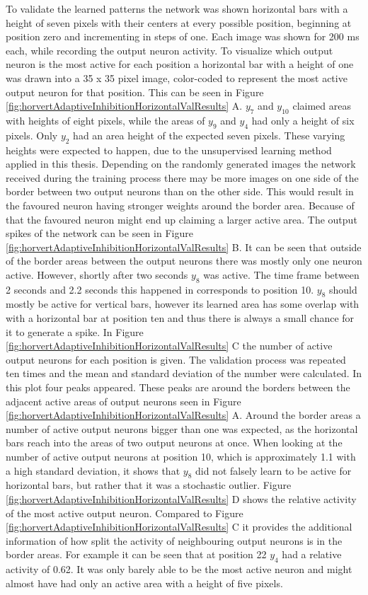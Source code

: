 To validate the learned patterns the network was shown horizontal bars with a height of seven pixels with their centers at every possible position, beginning at position zero and incrementing in steps of one. Each image was shown for 200 ms each, while recording the output neuron activity. To visualize which output neuron is the most active for each position a horizontal bar with a height of one was drawn into a 35 x 35 pixel image, color-coded to represent the most active output neuron for that position. This can be seen in Figure \ref{fig:horvertAdaptiveInhibitionHorizontalValResults} A. $y_7$ and $y_{10}$ claimed areas with heights of eight pixels, while the areas of $y_9$ and $y_4$ had only a height of six pixels. Only $y_2$ had an area height of the expected seven pixels. These varying heights were expected to happen, due to the unsupervised learning method applied in this thesis. Depending on the randomly generated images the network received during the training process there may be more images on one side of the border between two output neurons than on the other side. This would result in the favoured neuron having stronger weights around the border area. Because of that the favoured neuron might end up claiming a larger active area.
The output spikes of the network can be seen in Figure  \ref{fig:horvertAdaptiveInhibitionHorizontalValResults} B. It can be seen that outside of the border areas between the output neurons there was mostly only one neuron active. However, shortly after two seconds $y_8$ was active. The time frame between 2 seconds and 2.2 seconds this happened in corresponds to position 10. $y_8$ should mostly be active for vertical bars, however its learned area has some overlap with with a horizontal bar at position ten and thus there is always a small chance for it to generate a spike. 
In Figure \ref{fig:horvertAdaptiveInhibitionHorizontalValResults} C the number of active output neurons for each position is given.  The validation process was repeated ten times and the mean and standard deviation of the number were calculated. In this plot four peaks appeared. These peaks are around the borders between the adjacent active areas of output neurons seen in Figure \ref{fig:horvertAdaptiveInhibitionHorizontalValResults} A. Around the border areas a number of active output neurons bigger than one was expected, as the horizontal bars reach into the areas of two output neurons at once. When looking at the number of active output neurons at position 10, which is approximately 1.1 with a high standard deviation, it shows that $y_8$ did not falsely learn to be active for horizontal bars, but rather that it was a stochastic outlier. Figure \ref{fig:horvertAdaptiveInhibitionHorizontalValResults} D shows the relative activity of the most active output neuron. Compared to Figure \ref{fig:horvertAdaptiveInhibitionHorizontalValResults} C it provides the additional information of how split the activity of neighbouring output neurons is in the border areas. For example it can be seen that at position 22 $y_4$ had a relative activity of 0.62. It was only barely able to be the most active neuron and might almost have had only an active area with a height of five pixels.

